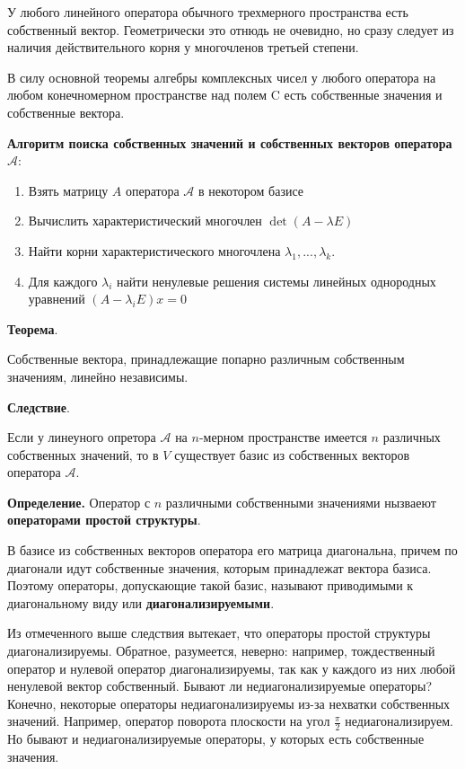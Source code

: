 \documentclass[a4paper]{article}
\begin{document}
У любого линейного оператора обычного трехмерного пространства
есть собственный вектор. Геометрически это отнюдь не очевидно, но сразу
следует из наличия действительного корня у многочленов третьей степени.

В силу основной теоремы алгебры комплексных чисел у любого
оператора на любом конечномерном пространстве над полем C есть
собственные значения и собственные вектора.

\textbf{Алгоритм поиска собственных значений и собственных векторов оператора $\mathcal{A}$}:
\begin{enumerate}
\item Взять матрицу $A$ оператора $\mathcal{A}$ в некотором базисе
\item Вычислить характеристический многочлен $\det(A - \lambda E)$
\item Найти корни характеристического многочлена $\lambda_1, ..., \lambda_k$.
\item Для каждого $\lambda_i$ найти ненулевые решения системы линейных однородных уравнений $(A-\lambda_i E) x = 0$
\end{enumerate}

\begin{htheorem}\textbf{Теорема}.

Собственные вектора, принадлежащие попарно различным собственным
значениям, линейно независимы.
\end{htheorem}

\begin{htheorem}\textbf{Следствие}.

Если у линеуного опретора $\mathcal{A}$ на $n$-мерном пространстве имеется $n$ различных собственных значений, то в $V$ существует базис из собственных векторов оператора $\mathcal{A}$.
\end{htheorem}

\textbf{Определение.} Оператор с $n$ различными собственными значениями нызваеют \textbf{операторами простой структуры}.

В базисе из собственных векторов оператора его матрица диагональна,
причем по диагонали идут собственные значения, которым принадлежат
вектора базиса. Поэтому операторы, допускающие такой базис, называют
приводимыми к диагональному виду или \textbf{диагонализируемыми}.

Из отмеченного выше следствия вытекает, что операторы простой
структуры диагонализируемы.
Обратное, разумеется, неверно: например, тождественный оператор и
нулевой оператор диагонализируемы, так как у каждого из них любой
ненулевой вектор собственный.
Бывают ли недиагонализируемые операторы? Конечно, некоторые
операторы недиагонализируемы из-за нехватки собственных значений.
Например, оператор поворота плоскости на угол $\frac{\pi}{2}$
недиагонализируем.
Но бывают и недиагонализируемые операторы, у которых есть
собственные значения.
\end{document}
